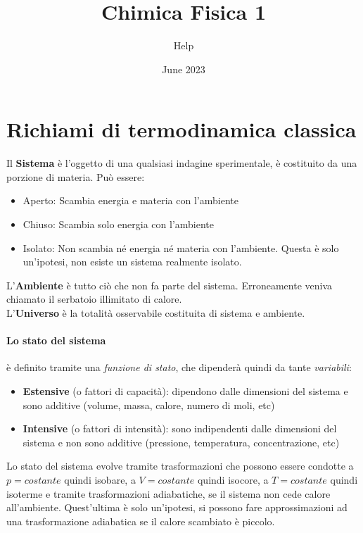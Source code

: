 \documentclass{article}
\title{Chimica Fisica 1}
\author{Help}
\date{June 2023}
\begin{document}
\maketitle
\tableofcontents

\newpage

\section{Richiami di termodinamica classica}

Il \textbf{Sistema} è l'oggetto di una qualsiasi indagine sperimentale, è costituito da una porzione di materia. Può essere:
\begin{itemize}
\item Aperto: Scambia energia e materia con l'ambiente
\item Chiuso: Scambia solo energia con l'ambiente
\item Isolato: Non scambia né energia né materia con l'ambiente. Questa è solo un'ipotesi, non esiste un sistema realmente isolato.
\end{itemize}
L'\textbf{Ambiente} è tutto ciò che non fa parte del sistema. Erroneamente veniva chiamato il serbatoio illimitato di calore. \\
L'\textbf{Universo} è la totalità osservabile costituita di sistema e ambiente.
\paragraph{Lo stato del sistema} è definito tramite una \textit{funzione di stato}, che dipenderà quindi da tante \textit{variabili}:
\begin{itemize}
    \item \textbf{Estensive} (o fattori di capacità): dipendono dalle dimensioni del sistema e sono additive (volume, massa, calore, numero di moli, etc) 
    \item \textbf{Intensive} (o fattori di intensità): sono indipendenti dalle dimensioni del sistema e non sono additive (pressione, temperatura, concentrazione, etc)
\end{itemize}
Lo stato del sistema evolve tramite trasformazioni che possono essere condotte a $p=costante$ quindi isobare, a $V=costante$ quindi isocore, a $T=costante$ quindi isoterme e tramite trasformazioni adiabatiche, se il sistema non cede calore all'ambiente. Quest'ultima è solo un'ipotesi, si possono fare approssimazioni ad una trasformazione adiabatica se il calore scambiato è piccolo. \\
\end{document}
